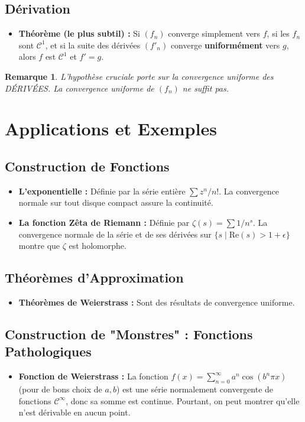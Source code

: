 \documentclass[12pt, a4paper, parskip=full]{report}
\theoremstyle{agregstyle}
\newtheorem{remark}[definition]{Remarque}
\begin{document}
\subsection{Dérivation}
\begin{itemize}
    \item \textbf{Théorème (le plus subtil) :} Si $(f_n)$ converge simplement vers $f$, si les $f_n$ sont $\mathcal{C}^1$, et si la suite des dérivées $(f'_n)$ converge \textbf{uniformément} vers $g$, alors $f$ est $\mathcal{C}^1$ et $f'=g$.
\end{itemize}
\begin{remark}
    L'hypothèse cruciale porte sur la convergence uniforme des DÉRIVÉES. La convergence uniforme de $(f_n)$ ne suffit pas.
\end{remark}

\section{Applications et Exemples}
\subsection{Construction de Fonctions}
\begin{itemize}
    \item \textbf{L'exponentielle :} Définie par la série entière $\sum z^n/n!$. La convergence normale sur tout disque compact assure la continuité.
    \item \textbf{La fonction Zêta de Riemann :} Définie par $\zeta(s) = \sum 1/n^s$. La convergence normale de la série et de ses dérivées sur $\{s \mid \mathrm{Re}(s) > 1+\epsilon\}$ montre que $\zeta$ est holomorphe.
\end{itemize}
\subsection{Théorèmes d'Approximation}
\begin{itemize}
    \item \textbf{Théorèmes de Weierstrass :} Sont des résultats de convergence uniforme.
\end{itemize}
\subsection{Construction de "Monstres" : Fonctions Pathologiques}
\begin{itemize}
    \item \textbf{Fonction de Weierstrass :} La fonction $f(x) = \sum_{n=0}^\infty a^n \cos(b^n \pi x)$ (pour de bons choix de $a,b$) est une série normalement convergente de fonctions $\mathcal{C}^\infty$, donc sa somme est continue. Pourtant, on peut montrer qu'elle n'est dérivable en aucun point.
\end{itemize}
\end{document}
